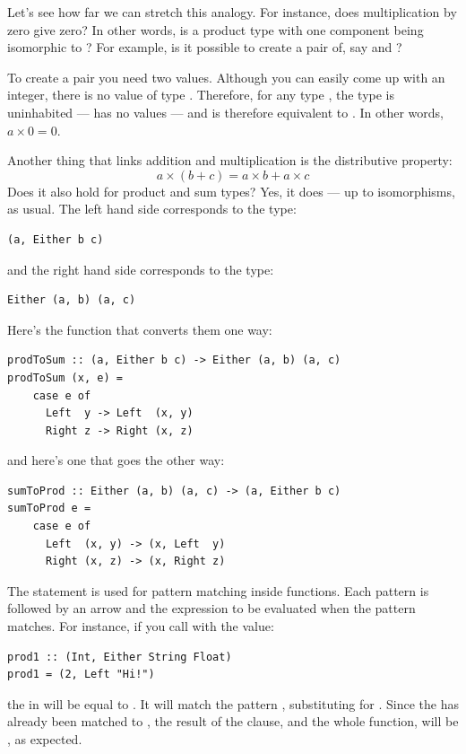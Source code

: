 Let's see how far we can stretch this analogy. For instance, does
multiplication by zero give zero? In other words, is a product type with
one component being  isomorphic to ? For
example, is it possible to create a pair of, say  and
?

To create a pair you need two values. Although you can easily come up
with an integer, there is no value of type . Therefore, for
any type , the type  is uninhabited --- has
no values --- and is therefore equivalent to . In other
words, $a \times 0 = 0$.

Another thing that links addition and multiplication is the distributive
property:
\[a \times (b + c) = a \times b + a \times c\]
Does it also hold for product and sum types? Yes, it does --- up to
isomorphisms, as usual. The left hand side corresponds to the type:

\begin{Verbatim}
(a, Either b c)
\end{Verbatim}
and the right hand side corresponds to the type:

\begin{Verbatim}
Either (a, b) (a, c)
\end{Verbatim}
Here's the function that converts them one way:

\begin{Verbatim}
prodToSum :: (a, Either b c) -> Either (a, b) (a, c)
prodToSum (x, e) =
    case e of
      Left  y -> Left  (x, y)
      Right z -> Right (x, z)
\end{Verbatim}
and here's one that goes the other way:

\begin{Verbatim}
sumToProd :: Either (a, b) (a, c) -> (a, Either b c)
sumToProd e =
    case e of
      Left  (x, y) -> (x, Left  y)
      Right (x, z) -> (x, Right z)
\end{Verbatim}
The  statement is used for pattern matching inside
functions. Each pattern is followed by an arrow and the expression to be
evaluated when the pattern matches. For instance, if you call
 with the value:

\begin{Verbatim}
prod1 :: (Int, Either String Float)
prod1 = (2, Left "Hi!")
\end{Verbatim}
the  in  will be equal to
. It will match the pattern ,
substituting  for . Since the  has
already been matched to , the result of the 
clause, and the whole function, will be , as
expected.

